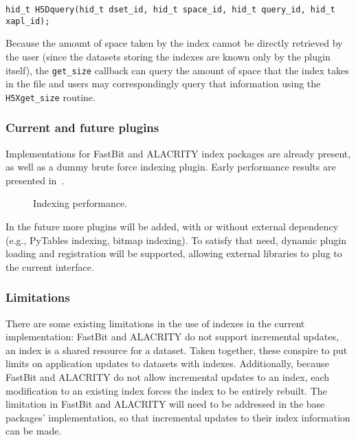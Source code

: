 {
\begin{lstlisting}
hid_t H5Dquery(hid_t dset_id, hid_t space_id, hid_t query_id, hid_t xapl_id);
\end{lstlisting}
}

Because the amount of space taken by the index cannot be directly retrieved by
the user (since the datasets storing the indexes are known only by the plugin
itself), the \texttt{get\_size} callback can query the amount of space that
the index takes in the file and users may correspondingly query that information using the
\texttt{H5Xget\_size} routine.

\subsubsection{Current and future plugins}

Implementations for FastBit and ALACRITY index packages are already
present, as well as a dummy brute force indexing plugin. Early performance results
are presented in~.

\begin{figure}
\vspace{-10pt}

\caption{Indexing performance.}
\label{fig:indexing_perf}
\vspace{-20pt}
\end{figure}

In the future more plugins will be added, with or without external dependency
(e.g., PyTables indexing, bitmap indexing).
To satisfy that need, dynamic plugin loading and registration will be supported,
allowing external libraries to plug to the current interface.

\subsubsection{Limitations}

There are some existing limitations in the use of indexes in the current
implementation: FastBit and ALACRITY do not support incremental updates,
an index is a shared resource for a dataset. Taken together, these conspire to
put limits on application updates to datasets with indexes.
Additionally, because FastBit and ALACRITY do not allow incremental updates to
an index, each modification to an existing index forces the index to be entirely
rebuilt. The limitation in FastBit and ALACRITY will need to be addressed in
the base packages' implementation, so that incremental updates
to their index information can be made.

